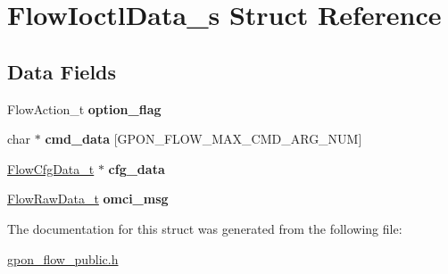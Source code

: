 \hypertarget{structFlowIoctlData__s}{}\section{Flow\+Ioctl\+Data\+\_\+s Struct Reference}
\label{structFlowIoctlData__s}
\subsection*{Data Fields}
\begin{DoxyCompactItemize}
\item 
\mbox{\label{structFlowIoctlData__s_a7e92fd629a4c10c3fdb2e35803b38bc2}} 
Flow\+Action\+\_\+t {\bfseries option\+\_\+flag}
\item 
\mbox{\label{structFlowIoctlData__s_a9fd859fad316b802dc1eeecdae8fbba6}} 
char $\ast$ {\bfseries cmd\+\_\+data} \mbox{[}G\+P\+O\+N\+\_\+\+F\+L\+O\+W\+\_\+\+M\+A\+X\+\_\+\+C\+M\+D\+\_\+\+A\+R\+G\+\_\+\+N\+UM\mbox{]}
\item 
\mbox{\label{structFlowIoctlData__s_ad5e2972b1110d53582607609a40e3c78}} 
\hyperlink{structFlowCfgData__s}{Flow\+Cfg\+Data\+\_\+t} $\ast$ {\bfseries cfg\+\_\+data}
\item 
\mbox{\label{structFlowIoctlData__s_a83f179fe9ed5696b1db0658f740a148d}} 
\hyperlink{structFlowRawData__s}{Flow\+Raw\+Data\+\_\+t} {\bfseries omci\+\_\+msg}
\end{DoxyCompactItemize}


The documentation for this struct was generated from the following file\+:\begin{DoxyCompactItemize}
\item 
\hyperlink{gpon__flow__public_8h}{gpon\+\_\+flow\+\_\+public.\+h}\end{DoxyCompactItemize}
